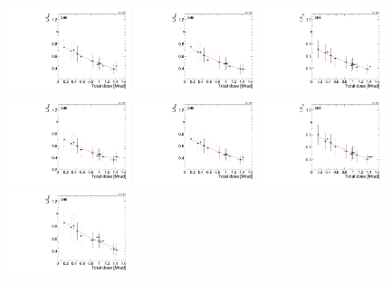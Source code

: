 \begin{figure}[tbp!]
\centering
\includegraphics[width=0.32\textwidth]{figures/SCSN81-F-27p2cm-f2ch5-dose.pdf}
\includegraphics[width=0.32\textwidth]{figures/SCSN81-F-27p2cm-f3ch5-dose.pdf}
\includegraphics[width=0.32\textwidth]{figures/SCSN81-F-27p2cm-f4ch0-dose.pdf}
\includegraphics[width=0.32\textwidth]{figures/SCSN81-F-27p2cm-f6ch1-dose.pdf}
\includegraphics[width=0.32\textwidth]{figures/SCSN81-F-27p2cm-f8ch4-dose.pdf}
\includegraphics[width=0.32\textwidth]{figures/SCSN81-F-27p2cm-f14ch2-dose.pdf}
\includegraphics[width=0.32\textwidth]{figures/SCSN81-F-27p2cm-f14ch5-dose.pdf}

\end{figure}
